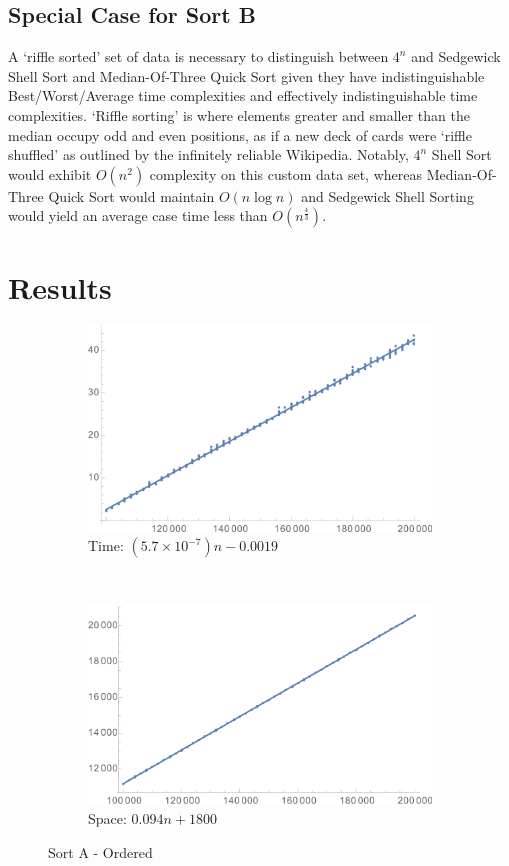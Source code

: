 \documentclass[a4paper]{scrartcl}
\begin{document}
\subsection{Special Case for Sort B}
A `riffle sorted' set of data is necessary to distinguish between \(4^n\) and Sedgewick Shell Sort and Median-Of-Three Quick Sort given they have indistinguishable Best/Worst/Average time complexities and effectively indistinguishable time complexities.
`Riffle sorting' is where elements greater and smaller than the median occupy odd and even positions, as if a new deck of cards were `riffle shuffled' as outlined by the infinitely reliable Wikipedia. Notably, \(4^n\) Shell Sort would exhibit \(O(n^2)\) complexity on this custom data set, whereas Median-Of-Three Quick Sort would maintain \(O(n \log{n})\) and Sedgewick Shell Sorting would yield an average case time less than \(O(n^\frac43)\).


\section{Results}
\begin{figure}[p]
    \centering
    \begin{subfigure}[b]{0.45\textwidth}
        \includegraphics[width = \textwidth]{sortA_ordered_time.png}
        \caption{Time: \((5.7 \times 10^{-7}) n - 0.0019\)}
    \end{subfigure}
    ~
    \begin{subfigure}[b]{0.45\textwidth}
        \includegraphics[width = \textwidth]{sortA_ordered_space.png}
        \caption{Space: \(0.094 n + 1800\)}
    \end{subfigure}
    \caption{Sort A - Ordered}
    \label{fig:sortA_ordered}
\end{figure}
\end{document}

